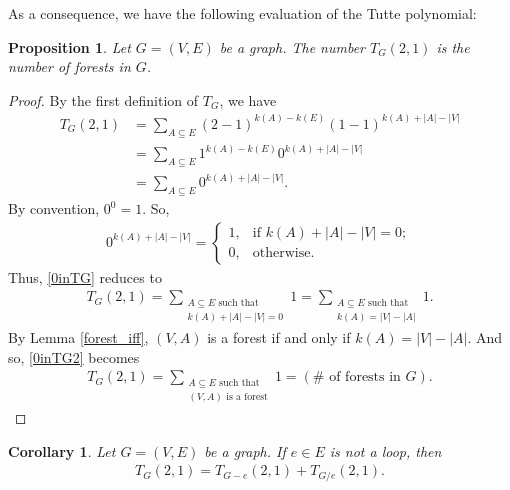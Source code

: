 \documentclass[12pt]{article}
\newtheorem{proposition}[theorem]{Proposition}
\newtheorem{corollary}[theorem]{Corollary}
\theoremstyle{definition}
\theoremstyle{remark}
\begin{document}
As a consequence, we have the following evaluation of the Tutte polynomial:

\begin{proposition}
    \label{num_of_trees}
	Let $G = (V, E)$ be a graph.
	The number $T_G(2,1)$ is the number of forests in $G$.
\end{proposition}

\begin{proof}
    By the first definition of $T_G$, we have \begin{align}
        T_G(2,1) &= \sum_{A \subseteq E}(2-1)^{k(A)-k(E)}(1-1)^{k(A)+|A|-|V|} \nonumber\\
        &= \sum_{A \subseteq E}1^{k(A)-k(E)}0^{k(A)+|A|-|V|} \nonumber\\
        &= \sum_{A \subseteq E}0^{k(A)+|A|-|V|}\label{0inTG}.
    \end{align} By convention, $0^0 = 1$. So, \begin{align*}
        0^{k(A)+|A|-|V|} = \begin{cases}
            1, & \text{if } k(A)+|A|-|V|=0; \\
            0, & \text{otherwise.}
        \end{cases}
    \end{align*} Thus, \eqref{0inTG} reduces to \begin{align}
        T_G(2,1) = \sum_{\substack{A \subseteq E \text{ such that} \\ k(A)+|A|-|V|=0}}1 = \sum_{\substack{A \subseteq E \text{ such that} \\ k(A) = |V|-|A|}}1. \label{0inTG2}
    \end{align} By Lemma \ref{forest_iff}, $(V,A)$ is a forest if and only if $k(A) = |V|-|A|$. And so, \eqref{0inTG2} becomes \begin{align*}
        T_G(2,1) = \sum_{\substack{A \subseteq E \text{ such that} \\ (V,A) \text{ is a forest}}}1 = (\# \text{ of forests in $G$}). \tag*{\qedhere}
    \end{align*}
\end{proof}

\begin{corollary}\label{tgnotloop}
    Let $G = (V, E)$ be a graph.
    If $e \in E$ is not a loop, then \begin{align*}
        T_G(2,1) = T_{G-e}(2,1)+T_{G/e}(2,1).
    \end{align*}
\end{corollary}
\end{document}
